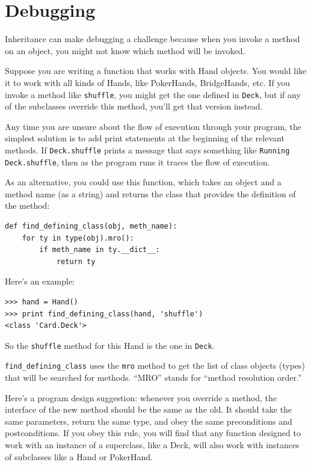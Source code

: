 \documentclass[10pt]{book}
\begin{document}
\section{Debugging}

Inheritance can make debugging a challenge because when you
invoke a method on an object, you might not know which method
will be invoked.

Suppose you are writing a function that works with Hand objects.
You would like it to work with all kinds of Hands, like
PokerHands, BridgeHands, etc.  If you invoke a method like
{\tt shuffle}, you might get the one defined in {\tt Deck},
but if any of the subclasses override this method, you'll
get that version instead.  

Any time you are unsure about the flow of execution through your
program, the simplest solution is to add print statements at the
beginning of the relevant methods.  If {\tt Deck.shuffle} prints a
message that says something like {\tt Running Deck.shuffle}, then as
the program runs it traces the flow of execution.

As an alternative, you could use this function, which takes an
object and a method name (as a string) and returns the class that
provides the definition of the method:

\begin{verbatim}
def find_defining_class(obj, meth_name):
    for ty in type(obj).mro():
        if meth_name in ty.__dict__:
            return ty
\end{verbatim}
%
Here's an example:

\begin{verbatim}
>>> hand = Hand()
>>> print find_defining_class(hand, 'shuffle')
<class 'Card.Deck'>
\end{verbatim}
%
So the {\tt shuffle} method for this Hand is the one in {\tt Deck}.

\verb"find_defining_class" uses the {\tt mro} method to get the list
of class objects (types) that will be searched for methods.  ``MRO''
stands for ``method resolution order.''

Here's a program design suggestion: whenever you override a method,
the interface of the new method should be the same as the old.  It
should take the same parameters, return the same type, and obey the
same preconditions and postconditions.  If you obey this rule, you
will find that any function designed to work with an instance of a
superclass, like a Deck, will also work with instances of subclasses
like a Hand or PokerHand.
\end{document}

